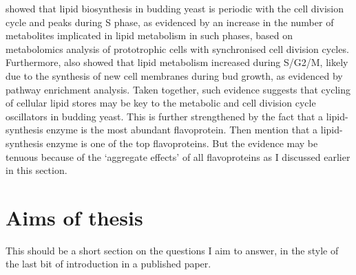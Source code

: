 \textcite{campbellBuildingBlocksAre2020} showed that lipid biosynthesis in budding yeast is periodic with the cell division cycle and peaks during S phase, as evidenced by an increase in the number of metabolites implicated in lipid metabolism in such phases, based on metabolomics analysis of prototrophic cells with synchronised cell division cycles.
Furthermore, \textcite{ewaldYeastCyclinDependentKinase2016} also showed that lipid metabolism increased during S/G2/M, likely due to the synthesis of new cell membranes during bud growth, as evidenced by pathway enrichment analysis.
Taken together, such evidence suggests that cycling of cellular lipid stores may be key to the metabolic and cell division cycle oscillators in budding yeast.
This is further strengthened by the fact that a lipid-synthesis enzyme is the most abundant flavoprotein.
Then mention that a lipid-synthesis enzyme is one of the top flavoproteins.
But the evidence may be tenuous because of the `aggregate effects' of all flavoproteins as I discussed earlier in this section.


\section{Aims of thesis} %
\label{sec:intro-end}

This should be a short section on the questions I aim to answer, in the style of the last bit of introduction in a published paper.

